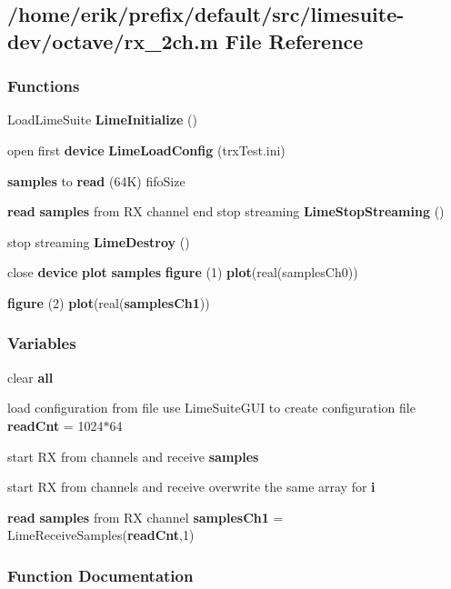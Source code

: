 \subsection{/home/erik/prefix/default/src/limesuite-\/dev/octave/rx\+\_\+2ch.m File Reference}
\label{rx__2ch_8m}
\subsubsection*{Functions}
\begin{DoxyCompactItemize}
\item 
Load\+Lime\+Suite {\bf Lime\+Initialize} ()
\item 
open first {\bf device} {\bf Lime\+Load\+Config} (\textquotesingle{}trx\+Test.\+ini\textquotesingle{})
\item 
{\bf samples} to {\bf read} (64\+K) fifo\+Size
\item 
{\bf read} {\bf samples} from RX channel end stop streaming {\bf Lime\+Stop\+Streaming} ()
\item 
stop streaming {\bf Lime\+Destroy} ()
\item 
close {\bf device} {\bf plot} {\bf samples} {\bf figure} (1) {\bf plot}(real(samples\+Ch0))
\item 
{\bf figure} (2) {\bf plot}(real({\bf samples\+Ch1}))
\end{DoxyCompactItemize}
\subsubsection*{Variables}
\begin{DoxyCompactItemize}
\item 
clear {\bf all}
\item 
load configuration from file use Lime\+Suite\+G\+UI to create configuration file {\bf read\+Cnt} = 1024$\ast$64
\item 
start RX from channels and receive {\bf samples}
\item 
start RX from channels and receive overwrite the same array for {\bf i}
\item 
{\bf read} {\bf samples} from RX channel {\bf samples\+Ch1} = Lime\+Receive\+Samples({\bf read\+Cnt},1)
\end{DoxyCompactItemize}


\subsubsection{Function Documentation}
